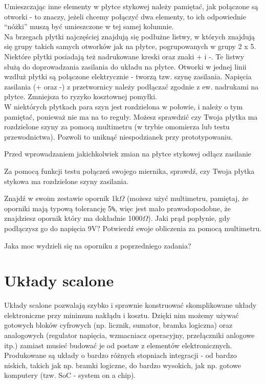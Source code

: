 \documentclass{pdfBooklets}
\begin{document}
Umieszczając inne elementy w płytce stykowej należy pamiętać, jak połączone są otworki - to znaczy, jeżeli chcemy
połączyć dwa elementy, to ich odpowiednie ``nóżki'' muszą być umieszczone w tej samej kolumnie.
\\

Na brzegach płytki najczęściej znajdują się podłużne listwy, w których znajdują się grupy takich samych otworków jak
na płytce, pogrupowanych w grupy 2 x 5. Niektóre płytki posiadają też nadrukowane kreski oraz znaki + i -. Te listwy
służą do doprowadzania zasilania do układu na płytce. Otworki w jednej linii wzdłuż płytki są połączone elektrycznie - tworzą tzw.
szynę zasilania. Napięcia zasilania (+ oraz -) z przetwornicy należy podłączać zgodnie z ew. nadrukami na płytce. Zmniejsza to ryzyko
kosztownej pomyłki.
\\

W niektórych płytkach para szyn jest rozdzielona w połowie, i należy o tym pamiętać, ponieważ nie ma na to reguły.
Możesz sprawdzić czy Twoja płytka ma rozdzielone szyny za pomocą multimetru (w trybie omomierza lub testu przewodnictwa). Pozwoli to uniknąć
niespodzianek przy prototypowaniu.

\begin{ProTip}{}
  Przed wprowadzaniem jakichkolwiek zmian na płytce stykowej odłącz zasilanie
\end{ProTip}

\begin{Zadanie}{}{}
Za pomocą funkcji testu połączeń swojego miernika, sprawdź, czy Twoja płytka stykowa ma rozdzielone szyny zasilania.
\end{Zadanie}

\begin{Zadanie}{}{}
  Znajdź w swoim zestawie opornik 1k$\Omega$ (możesz użyć multimetru, pamiętaj, że oporniki mają typową tolerancję 5\Verb$%
  za pomocą multimetru.
\end{Zadanie}

\begin{Zadanie}{}{}
  Jaka moc wydzieli się na oporniku z poprzedniego zadania?
\end{Zadanie}


\section{Układy scalone}
Układy scalone pozwalają szybko i sprawnie konstruować skomplikowane układy elektroniczne przy minimum nakłądu i kosztu. Dzięki nim możemy
używać gotowych bloków cyfrowych (np. licznik, sumator, bramka logiczna) oraz analogowych (regulator napięcia, wzmacniacz operacyjny,
przełączniki anlogowe itp.) zamiast musieć budować je od postaw z elementów elektronicznych. Produkowane są układy o bardzo różnych stopniach
integracji - od bardzo niskich, takich jak np. bramki logiczne, do bardzo wysokich, jak np. gotowe komputery (tzw. SoC - system on a chip).
\\
\end{document}
